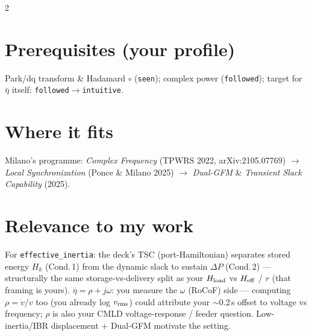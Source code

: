 \documentclass[10pt]{article}
\newcommand{\cb}[1]{\bar{#1}}
\begin{document}
\begin{multicols}{2}
\section*{Prerequisites (your profile)}
Park/dq transform \& Hadamard $\circ$ (\texttt{seen}); complex power (\texttt{followed});
target for $\cb\eta$ itself: \texttt{followed}$\to$\texttt{intuitive}.

\section*{Where it fits}
Milano's programme: \emph{Complex Frequency} (TPWRS 2022, arXiv:2105.07769) $\to$
\emph{Local Synchronization} (Ponce \& Milano 2025) $\to$ \emph{Dual-GFM} \&
\emph{Transient Slack Capability} (2025).

\section*{Relevance to my work}
For \texttt{effective\_inertia}: the deck's TSC (port-Hamiltonian) separates stored energy
$H_k$ (Cond.\,1) from the dynamic slack to sustain $\Delta P$ (Cond.\,2) --- structurally the
same storage-vs-delivery split as your $H_{\rm load}$ vs $H_{\rm eff}$ / $r$ (that framing is
yours). $\cb\eta=\rho+j\omega$: you measure the $\omega$ (RoCoF) side --- computing $\rho=\dot
v/v$ too (you already log $v_{\rm rms}$) could attribute your $\sim$0.2\,s offset to voltage
vs frequency; $\rho$ is also your CMLD voltage-response / feeder question. Low-inertia/IBR
displacement + Dual-GFM motivate the setting.
\end{multicols}
\end{document}

